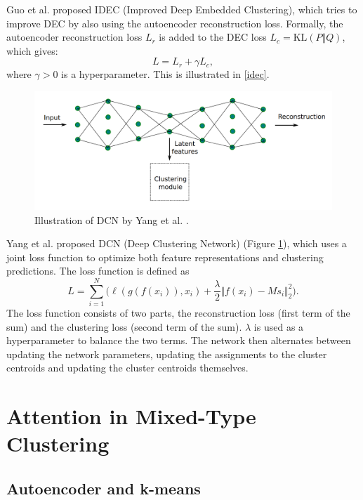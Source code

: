 Guo et al. \cite{idec} proposed IDEC (Improved Deep Embedded Clustering), which tries to improve DEC by also using the autoencoder reconstruction loss. Formally, the autoencoder reconstruction loss $L_r$ is added to the DEC loss $L_c = \text{KL}(P \Vert Q)$, which gives:
$$L = L_r + \gamma L_c,$$
where $\gamma > 0$ is a hyperparameter. This is illustrated in \ref{idec}.

\begin{figure}
\centering
	\includegraphics[width=0.9\linewidth]{dcn.png}
	\caption{Illustration of DCN by Yang et al. \cite{dcn}.}
	\label{dcn}
\end{figure}

Yang et al. \cite{dcn} proposed DCN (Deep Clustering Network) (Figure \ref{dcn}), which uses a joint loss function to optimize both feature representations and clustering predictions. The loss function is defined as
$$L = \sum^N_{i=1} \Big(\ell(g(f(x_i)), x_i)+ \frac{\lambda}{2}\Vert f(x_i)-Ms_i\Vert^2_2\Big).$$
The loss function consists of two parts, the reconstruction loss (first term of the sum) and the clustering loss (second term of the sum). $\lambda$ is used as a hyperparameter to balance the two terms. The network then alternates between updating the network parameters, updating the assignments to the cluster centroids and updating the cluster centroids themselves.

\chapter{Attention in Mixed-Type Clustering}

\section{Autoencoder and k-means} \label{Autoencoder and k-means}

